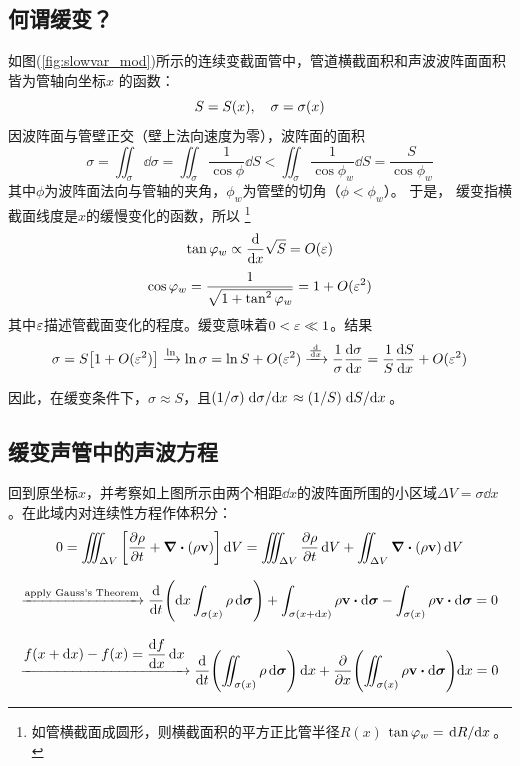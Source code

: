 \documentclass[UTF8]{ctexbook}
\begin{document}
\subsection{何谓缓变？}
如图(\ref{fig:slowvar_mod})所示的连续变截面管中，管道横截面积和声波波阵面面积皆为管轴向坐标$x$
的函数：
\begin{equation}
	S=S(x)\qc \sigma = \sigma (x)
\end{equation}
因波阵面与管壁正交（壁上法向速度为零），波阵面的面积
$$
\sigma = \iint_\sigma \dd{\sigma} = \iint_\sigma 
\frac{1}{\cos \phi} \dd{S} < \iint_\sigma \frac{1}{\cos\phi_w}\dd{S}
=\frac{S}{\cos\phi_w}$$
其中$\phi$为波阵面法向与管轴的夹角，$\phi_w$为管壁的切角（$\phi<\phi_w$）。
于是，
缓变指横截面线度是$x$的缓慢变化的函数，所以
\footnote{如管横截面成圆形，则横截面积的平方正比管半径$R(x)$
	$\tan\varphi_w = \dv*{R}{x}$。}
$$
\tan \varphi_w \propto \dv{x} \sqrt{S} = O(\varepsilon)
$$
$$\cos \varphi_w = \dfrac{1}{\sqrt{1+\tan^2 \varphi_w}} = 1+O(\varepsilon^2)
$$
其中$\varepsilon$描述管截面变化的程度。缓变意味着$0<\varepsilon \ll 1$。结果
\begin{equation}
	\label{eq:slowvar_approx}
	\sigma = S\qty[1+O(\varepsilon^2)] \xrightarrow{\ln} \ln \sigma = 
	\ln S+O(\varepsilon^2) \xrightarrow{\dv{x}} \frac1\sigma \dv{\sigma}{x}
	=\frac1S \dv{S}{x}  + O(\varepsilon^2)
\end{equation}

因此，在缓变条件下，$\sigma \approx S$，且$(1/\sigma ) \dv*{\sigma}{x}
\approx (1/S)\dv*{S}{x}$。

\subsection{缓变声管中的声波方程}
回到原坐标$x$，并考察如上图所示由两个相距$\dd{x}$的波阵面所围的小区域$
\Delta V=\sigma \dd{x}$。在此域内对连续性方程作体积分：
$$
0 = \iiint_{\Delta V} \qty[\pdv{\rho}{t} + \div(\rho\vb{v})] \dd{V}
=\iiint_{\Delta V} \pdv{\rho}{t} \dd{V} + \iint_{\Delta V}\div (\rho \vb{v})
\dd{V}
$$

$$
\xrightarrow{\text{apply Gauss's Theorem}} \dv{t} \qty(\dd{x} \int_{\sigma
(x)} \rho \dd{\bm{\sigma}}) + \int_{\sigma (x+\dd{x})} 
\rho \vb{v}\vdot \dd{\bm{\sigma}} - \int_{\sigma(x)} \rho\vb{v} \vdot \dd
\bm{\sigma} = 0
$$

$$
\xrightarrow{\displaystyle f(x+\dd{x})-f(x) = \dv{f}{x} \dd{x}} 
\dv{t} \qty(\iint_{\sigma(x)} \rho \dd{\bm{\sigma}}) \dd{x}
+\pdv{x} \qty(\iint_{\sigma(x)} \rho \vb{v} \vdot \dd{\bm{\sigma}})\dd x
=0
$$
\end{document}
